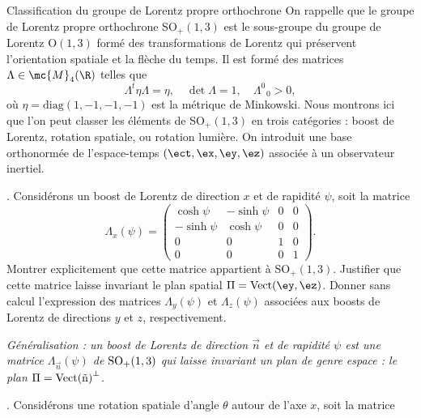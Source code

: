 \begin{exo}[PC][3][TD]{Classification du groupe de Lorentz propre orthochrone}
  On rappelle que le groupe de Lorentz propre orthochrone SO$_+(1,3)$ est le sous-groupe du groupe de Lorentz O$(1,3)$ formé des transformations de Lorentz qui préservent l'orientation spatiale et la flèche du temps. Il est formé des matrices $\Lambda \in \mc{M}_4(\R)$ telles que 
  \begin{equation}
    \Lambda^t \eta \Lambda = \eta, \quad \det \Lambda = 1, \quad \Lambda^0_{\,\,\,\,0} > 0,
  \end{equation}
  où $\eta = \text{diag}(1,-1,-1,-1)$ est la métrique de Minkowski. Nous montrons ici que l'on peut classer les éléments de SO$_+(1,3)$ en trois catégories : boost de Lorentz, rotation spatiale, ou rotation lumière. On introduit une base orthonormée de l'espace-temps $(\ect,\ex,\ey,\ez)$ associée à un observateur inertiel.
  \begin{quest}
    \item	{}. Considérons un boost de Lorentz de direction $x$ et de rapidité $\psi$, soit la matrice
    \begin{equation}
      \Lambda_x(\psi) = \begin{pmatrix}
        \cosh \psi & -\sinh \psi & 0 & 0 \\
        -\sinh \psi & \cosh \psi & 0 & 0 \\
        0 & 0 & 1 & 0 \\
        0 & 0 & 0 & 1
      \end{pmatrix}.
    \end{equation}
    Montrer explicitement que cette matrice appartient à SO$_+(1,3)$. Justifier que cette matrice laisse invariant le plan spatial $\Pi=\text{Vect}(\ey,\ez)$.
    Donner sans calcul l'expression des matrices $\Lambda_y(\psi)$ et $\Lambda_z(\psi)$ associées aux boosts de Lorentz de directions $y$ et $z$, respectivement.
    \begin{center}
      \emph{Généralisation : un boost de Lorentz de direction $\Vec{n}$ et de rapidité $\psi$ est une matrice $\Lambda_{\Vec{n}}(\psi)$ de ${\rm SO}_+(1,3)$ qui laisse invariant un plan de genre espace : le plan $\Pi=\rm{Vect}{(\Vec{n})}^\perp$.}
    \end{center}
    \item {}. Considérons une rotation spatiale d'angle $\theta$ autour de l'axe $x$, soit la matrice

\end{quest}
\end{exo}
